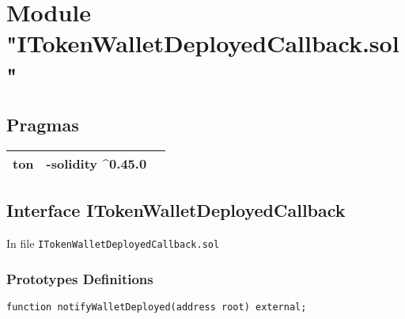 
\section{Module "ITokenWalletDeployedCallback.sol"}


\subsection{Pragmas}


\noindent\begin{tabular}{|l|l|p{5cm}|}\hline
ton & -solidity \^{}0.45.0 &\\\hline
\end{tabular}


\subsection{Interface ITokenWalletDeployedCallback}


In file {\tt ITokenWalletDeployedCallback.sol}

\subsubsection{Prototypes Definitions}

\vspace{2cm}

\begin{lstlisting}[firstnumber=4]
    function notifyWalletDeployed(address root) external;
\end{lstlisting}
